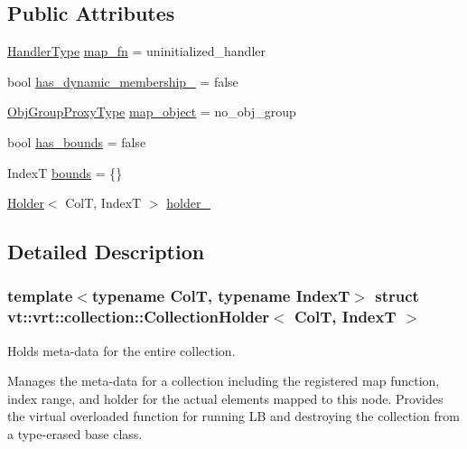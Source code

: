 \subsection*{Public Attributes}
\begin{DoxyCompactItemize}
\item 
\hyperlink{namespacevt_af64846b57dfcaf104da3ef6967917573}{Handler\+Type} \hyperlink{structvt_1_1vrt_1_1collection_1_1_collection_holder_a1bacbcdc0af1d6a69abf890304c78233}{map\+\_\+fn} = uninitialized\+\_\+handler
\item 
bool \hyperlink{structvt_1_1vrt_1_1collection_1_1_collection_holder_a11cfbe2ada9f49d12ed63ff709aca4cd}{has\+\_\+dynamic\+\_\+membership\+\_\+} = false
\item 
\hyperlink{namespacevt_ad7cae989df485fccca57f0792a880a8e}{Obj\+Group\+Proxy\+Type} \hyperlink{structvt_1_1vrt_1_1collection_1_1_collection_holder_a719c913a9d373289043f39a344012090}{map\+\_\+object} = no\+\_\+obj\+\_\+group
\item 
bool \hyperlink{structvt_1_1vrt_1_1collection_1_1_collection_holder_a163ff25a81d1e0d6b3764aa0ea825aef}{has\+\_\+bounds} = false
\item 
IndexT \hyperlink{structvt_1_1vrt_1_1collection_1_1_collection_holder_a1a3f0e52624de2c77d4d5fcd15e293eb}{bounds} = \{\}
\item 
\hyperlink{structvt_1_1vrt_1_1collection_1_1_holder}{Holder}$<$ ColT, IndexT $>$ \hyperlink{structvt_1_1vrt_1_1collection_1_1_collection_holder_a509a3abe1ab350cc1d108030977ab0e9}{holder\+\_\+}
\end{DoxyCompactItemize}


\subsection{Detailed Description}
\subsubsection*{template$<$typename ColT, typename IndexT$>$\newline
struct vt\+::vrt\+::collection\+::\+Collection\+Holder$<$ Col\+T, Index\+T $>$}

Holds meta-\/data for the entire collection. 

Manages the meta-\/data for a collection including the registered map function, index range, and holder for the actual elements mapped to this node. Provides the virtual overloaded function for running LB and destroying the collection from a type-\/erased base class. 

